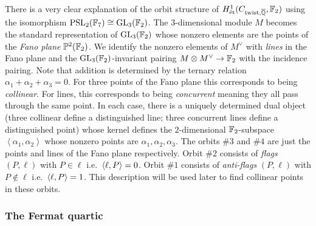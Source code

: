 \documentclass[main.tex]{subfiles}
\begin{document}
There is a very clear explanation of the orbit structure of $ H^1_{\mathrm{\acute{e}t}}(C_{\mathrm{twist}, \overline{\mathbb{Q}}}, \mathbb{F}_2)$ using the isomorphism $\mathrm{PSL}_2(\mathbb{F}_7) \cong \mathrm{GL}_3(\mathbb{F}_2)$. The $3$-dimensional module $M$ becomes the standard representation of $\mathrm{GL}_3(\mathbb{F}_2)$ whose nonzero elements are the points of the \textit{Fano plane} $\mathbb{P}^2(\mathbb{F}_2)$. We identify the nonzero elements of $M^{\vee}$ with \textit{lines} in the Fano plane and the $\mathrm{GL}_3(\mathbb{F}_2)$-invariant pairing $M \otimes M^{\vee} \to \mathbb{F}_2$ with the incidence pairing. Note that addition is determined by the ternary relation $\alpha_1 + \alpha_2 + \alpha_3 = 0$. For three points of the Fano plane this corresponds to being \textit{collinear}. For lines, this corresponds to being \textit{concurrent} meaning they all pass through the same point. In each case, there is a uniquely determined dual object (three collinear define a distinguished line; three concurrent lines define a distinguished point) whose kernel defines the $2$-dimensional $\mathbb{F}_2$-subspace $\left< \alpha_1, \alpha_2 \right>$ whose nonzero points are $\alpha_1, \alpha_2, \alpha_3$. The orbits $\# 3$ and $\# 4$ are just the points and lines of the Fano plane respectively. Orbit $\# 2$ consists of \textit{flags} $(P, \ell)$ with $P \in \ell$ i.e.\ $\left< \ell, P \right> = 0$. Orbit $\# 1$ consists of \textit{anti-flags} $(P, \ell)$ with $P \notin \ell$ i.e.\ $\left< \ell, P \right> = 1$. This description will be used later to find collinear points in these orbits. 

\subsubsection{The Fermat quartic}
\end{document}
